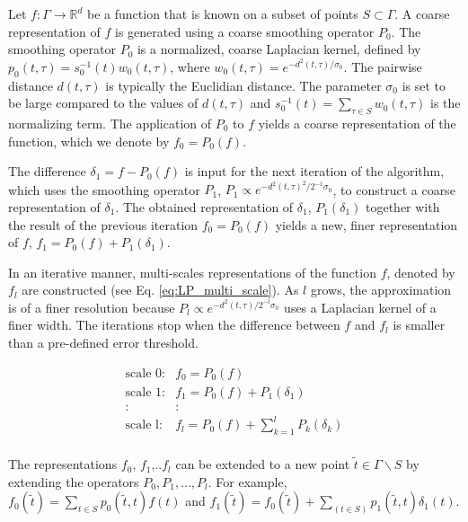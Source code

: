 \documentclass[aip,jcp,reprint,twocolumn]{revtex4-1}
\begin{document}
Let $f: \Gamma \rightarrow \mathbb{R}^d$ be a function that is known on a subset of points $S \subset \Gamma$.
%
A coarse representation of $f$ is generated using a coarse smoothing operator $P_0$.
%
The smoothing operator $P_0$ is a normalized, coarse Laplacian kernel, defined by $p_0(t,\tau)= s_0^{-1}(t)w_0(t,\tau)$, where $w_0(t,\tau)=e^{-d^2(t,\tau) / \sigma_0}$. 
%
The pairwise distance $d(t,\tau)$ is typically the Euclidian distance. 
%
The parameter $\sigma_0$ is set to be large compared to the values of $d(t,\tau)$  and $s_0^{-1}(t)=\sum_{\tau \in S}w_0(t,\tau)$ is the normalizing term. 
%
The application of $P_0$ to $f$ yields a coarse representation of the function, which we denote by $f_0=P_0(f)$.

The difference $\delta_1 = f-P_0(f)$ is input for the next iteration of the algorithm, 
which uses the smoothing operator $P_1$, $P_1 \propto e^{-d^2(t,\tau)^2 / 2^{-1} \sigma_0}$, to construct a coarse representation of $\delta_1$.
%
The obtained  representation of $\delta_1$, $P_1(\delta_1)$ together with the result of the previous iteration $f_0 = P_0(f)$ 
yields a new, finer representation of $f$, $f_1 = P_0(f) + P_1(\delta_1)$.

In an iterative manner, multi-scales representations of the function $f$, denoted by $f_l$ are constructed (see Eq. \eqref{eq:LP_multi_scale}). 
%
As $l$ grows, the approximation is of a finer resolution because $P_l \propto e^{-d^2(t,\tau) / 2^{-l} \sigma_0}$ uses a Laplacian kernel of a finer width. 
%
The iterations stop when the difference between $f$ and $f_l$ is smaller than a pre-defined error threshold.

\begin{equation} \label{eq:LP_multi_scale}
 \begin{array}{cl}
\mbox{scale 0:} & f_0 = P_0(f) \\
\mbox{scale 1:} & f_1 = P_0(f) + P_1(\delta_1) \\
: & : \\
\mbox{scale l:} & f_l = P_0(f) + \sum_{k=1}^{l}P_k(\delta_k)\\
\end{array}
\end{equation}

The representations $f_0$, $f_1$,..$f_l$ can be extended to a new point $\tilde{t} \in \Gamma \backslash S $ by extending the operators $P_0, P_1,\ldots,P_l$. 
%
For example, $f_0(\tilde{t}) = \sum_{t \in S} p_0(\tilde{t}, t)f(t)$ and
$f_1(\tilde{t}) = f_0(\tilde{t}) + \sum_{(t \in S)}p_1(\tilde{t}, t)\delta_1(t)$.
\end{document}
